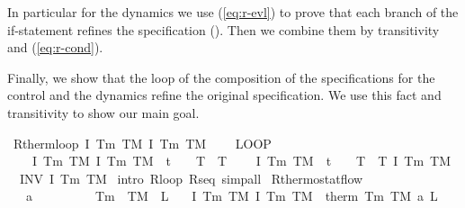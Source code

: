 \documentclass[envcountsame,envcountsect]{llncs}
\begin{document}
\begin{example}
In particular for the dynamics we use (\ref{eq:r-evl}) to prove that each branch of the if-statement refines the specification (). Then we combine them by transitivity and (\ref{eq:r-cond}). 

Finally, we show that the loop of the composition of the specifications for the control and the dynamics refine the original specification. We use this fact and transitivity to show our main goal.

\begin{isabellebody}

\isanewline
{}\isamarkupfalse%
\ R{\isacharunderscore}therm{\isacharunderscore}loop{\isacharcolon}\ {\isachardoublequoteopen}\isactrlbold {\isacharbrackleft}I\ T\isactrlsub m\ T\isactrlsub M{\isacharcomma}\ I\ T\isactrlsub m\ T\isactrlsub M\isactrlbold {\isacharbrackright}\ {\isasymge}\ \isanewline
\ \ {\isacharparenleft}LOOP\ \isanewline
\ \ \ \ \isactrlbold {\isacharbrackleft}I\ T\isactrlsub m\ T\isactrlsub M{\isacharcomma}\ I\ T\isactrlsub m\ T\isactrlsub M\ {\isasymand}\ t\ {\isacharequal}\ {}\ {\isasymand}\ T\ {\isacharequal}\ T\isactrlbold {\isacharbrackright}{\isacharsemicolon}\isanewline
\ \ \ \ \isactrlbold {\isacharbrackleft}I\ T\isactrlsub m\ T\isactrlsub M\ {\isasymand}\ t\ {\isacharequal}\ {}\ {\isasymand}\ T\ {\isacharequal}\ T{\isacharcomma}\ I\ T\isactrlsub m\ T\isactrlsub M\isactrlbold {\isacharbrackright}\isanewline
\ \ INV\ I\ T\isactrlsub m\ T\isactrlsub M{\isacharparenright}{\isachardoublequoteclose}\isanewline
{}\isamarkupfalse%
\ {\isacharparenleft}intro\ R{\isacharunderscore}loop\ R{\isacharunderscore}seq{\isacharcomma}\ simp{\isacharunderscore}all{\isacharparenright}\isanewline
\isanewline
{}\isamarkupfalse%
\ R{\isacharunderscore}thermostat{\isacharunderscore}flow{\isacharcolon}\ \isanewline
\ \ \ {\isachardoublequoteopen}a\ {\isachargreater}\ {}{\isachardoublequoteclose}\ \ {\isachardoublequoteopen}{}\ {\isasymle}\ {\isasymtau}{\isachardoublequoteclose}\ \ {\isachardoublequoteopen}{}\ {\isacharless}\ T\isactrlsub m{\isachardoublequoteclose}\ \ {\isachardoublequoteopen}T\isactrlsub M\ {\isacharless}\ L{\isachardoublequoteclose}\isanewline
\ \ \ {\isachardoublequoteopen}\isactrlbold {\isacharbrackleft}I\ T\isactrlsub m\ T\isactrlsub M{\isacharcomma}\ I\ T\isactrlsub m\ T\isactrlsub M\isactrlbold {\isacharbrackright}\ {\isasymge}\ therm\ T\isactrlsub m\ T\isactrlsub M\ a\ L\ {\isasymtau}{\isachardoublequoteclose}\isanewline

\end{isabellebody}
\end{example}
\end{document}

